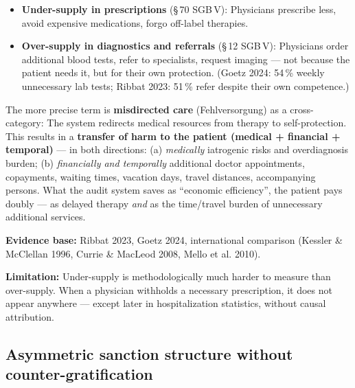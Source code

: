 \documentclass{umbruch-position}
\providecommand{\textgerman}[1]{#1}
\begin{document}
\begin{itemize}
  \item \textbf{Under-supply in prescriptions} (\S\,70 SGB\,V): Physicians prescribe less, avoid expensive medications, forgo off-label therapies.
  \item \textbf{Over-supply in diagnostics and referrals} (\S\,12 SGB\,V): Physicians order additional blood tests, refer to specialists, request imaging --- not because the patient needs it, but for their own protection. (Goetz 2024: 54\,\% weekly unnecessary lab tests; Ribbat 2023: 51\,\% refer despite their own competence.)
\end{itemize}

The more precise term is \textbf{misdirected care} (\textgerman{Fehlversorgung}) as a cross-category: The system redirects medical resources from therapy to self-protection. This results in a \textbf{transfer of harm to the patient (medical + financial + temporal)} --- in both directions: (a) \textit{medically} iatrogenic risks and overdiagnosis burden; (b) \textit{financially and temporally} additional doctor appointments, copayments, waiting times, vacation days, travel distances, accompanying persons. What the audit system saves as ``economic efficiency'', the patient pays doubly --- as delayed therapy \emph{and} as the time/travel burden of unnecessary additional services.

\textbf{Evidence base:} Ribbat 2023, Goetz 2024, international comparison (Kessler \& McClellan 1996, Currie \& MacLeod 2008, Mello et al. 2010).

\textbf{Limitation:} Under-supply is methodologically much harder to measure than over-supply. When a physician withholds a necessary prescription, it does not appear anywhere --- except later in hospitalization statistics, without causal attribution.

\subsection{Asymmetric sanction structure without counter-gratification}
\end{document}
